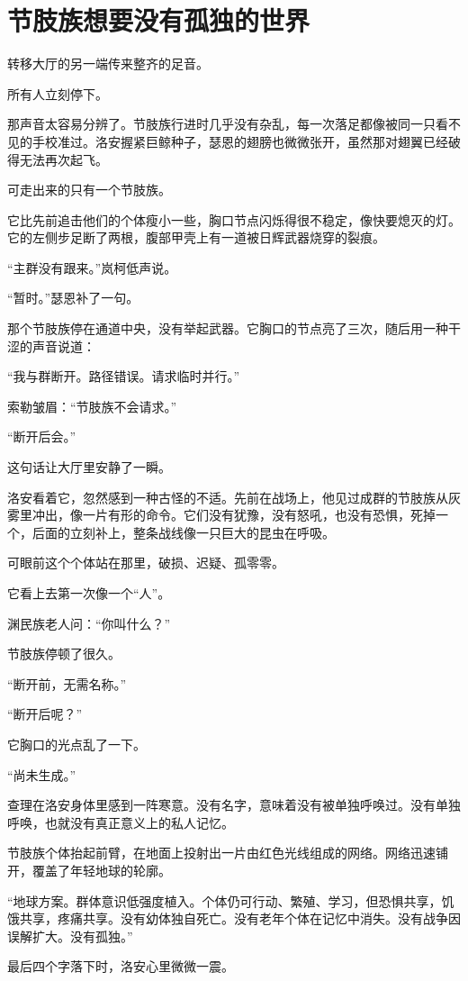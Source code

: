 \chapter{节肢族想要没有孤独的世界}

转移大厅的另一端传来整齐的足音。

所有人立刻停下。

那声音太容易分辨了。节肢族行进时几乎没有杂乱，每一次落足都像被同一只看不见的手校准过。洛安握紧巨鲸种子，瑟恩的翅膀也微微张开，虽然那对翅翼已经破得无法再次起飞。

可走出来的只有一个节肢族。

它比先前追击他们的个体瘦小一些，胸口节点闪烁得很不稳定，像快要熄灭的灯。它的左侧步足断了两根，腹部甲壳上有一道被日辉武器烧穿的裂痕。

“主群没有跟来。”岚柯低声说。

“暂时。”瑟恩补了一句。

那个节肢族停在通道中央，没有举起武器。它胸口的节点亮了三次，随后用一种干涩的声音说道：

“我与群断开。路径错误。请求临时并行。”

索勒皱眉：“节肢族不会请求。”

“断开后会。”

这句话让大厅里安静了一瞬。

洛安看着它，忽然感到一种古怪的不适。先前在战场上，他见过成群的节肢族从灰雾里冲出，像一片有形的命令。它们没有犹豫，没有怒吼，也没有恐惧，死掉一个，后面的立刻补上，整条战线像一只巨大的昆虫在呼吸。

可眼前这个个体站在那里，破损、迟疑、孤零零。

它看上去第一次像一个“人”。

渊民族老人问：“你叫什么？”

节肢族停顿了很久。

“断开前，无需名称。”

“断开后呢？”

它胸口的光点乱了一下。

“尚未生成。”

查理在洛安身体里感到一阵寒意。没有名字，意味着没有被单独呼唤过。没有单独呼唤，也就没有真正意义上的私人记忆。

节肢族个体抬起前臂，在地面上投射出一片由红色光线组成的网络。网络迅速铺开，覆盖了年轻地球的轮廓。

“地球方案。群体意识低强度植入。个体仍可行动、繁殖、学习，但恐惧共享，饥饿共享，疼痛共享。没有幼体独自死亡。没有老年个体在记忆中消失。没有战争因误解扩大。没有孤独。”

最后四个字落下时，洛安心里微微一震。

